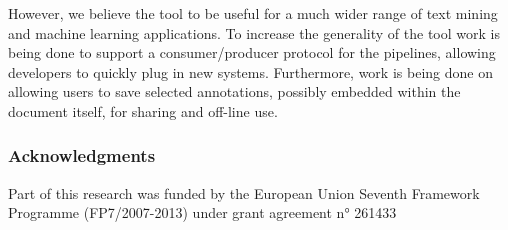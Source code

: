 \documentclass[runningheads,a4paper]{llncs}
\begin{document}
However, we believe the tool to be useful for a much wider range of text mining and machine learning applications.
To increase the generality of the tool work is being done to support a consumer/producer protocol for the pipelines, allowing developers to quickly plug in new systems.
Furthermore, work is being done on allowing users to save selected annotations, possibly embedded within the document itself, for sharing and off-line use.

\subsubsection{Acknowledgments}
Part of this research was funded by the European Union Seventh Framework Programme (FP7/2007-2013) under grant agreement n° 261433



\end{document}
